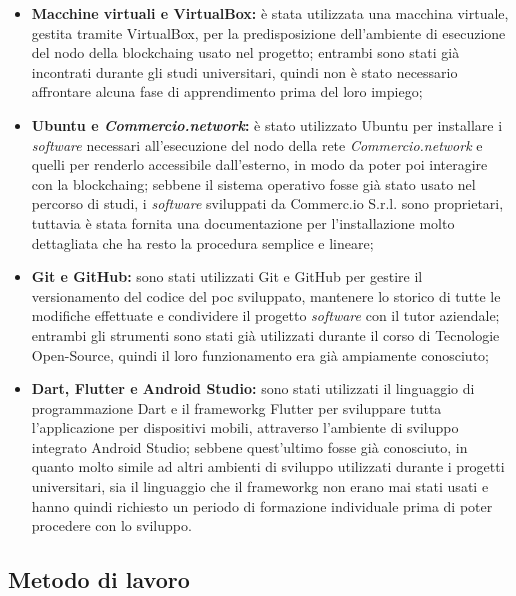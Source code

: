 \begin{itemize}
	\item \textbf{Macchine virtuali e VirtualBox:} è stata utilizzata una macchina virtuale, gestita tramite VirtualBox, per la predisposizione dell'ambiente di esecuzione del nodo della \gls{blockchaing} usato nel progetto; entrambi sono stati già incontrati durante gli studi universitari, quindi non è stato necessario affrontare alcuna fase di apprendimento prima del loro impiego;
	\item \textbf{Ubuntu e \textit{Commercio.network}:} è stato utilizzato Ubuntu per installare i \textit{software} necessari all'esecuzione del nodo della rete \textit{Commercio.network} e quelli per renderlo accessibile dall'esterno, in modo da poter poi interagire con la \gls{blockchaing}; sebbene il sistema operativo fosse già stato usato nel percorso di studi, i \textit{software} sviluppati da Commerc.io S.r.l. sono proprietari, tuttavia è stata fornita una documentazione per l'installazione molto dettagliata che ha resto la procedura semplice e lineare;
	\item \textbf{Git e GitHub:} sono stati utilizzati Git e GitHub per gestire il versionamento del codice del \gls{poc} sviluppato, mantenere lo storico di tutte le modifiche effettuate e condividere il progetto \textit{software} con il tutor aziendale; entrambi gli strumenti sono stati già utilizzati durante il corso di Tecnologie Open-Source, quindi il loro funzionamento era già ampiamente conosciuto;
	\item \textbf{Dart, Flutter e Android Studio:} sono stati utilizzati il linguaggio di programmazione Dart e il \gls{frameworkg} Flutter per sviluppare tutta l'applicazione per dispositivi mobili, attraverso l'ambiente di sviluppo integrato Android Studio; sebbene quest'ultimo fosse già conosciuto, in quanto molto simile ad altri ambienti di sviluppo utilizzati durante i progetti universitari, sia il linguaggio che il \gls{frameworkg} non erano mai stati usati e hanno quindi richiesto un periodo di formazione individuale prima di poter procedere con lo sviluppo.
\end{itemize}

\subsection{Metodo di lavoro}

